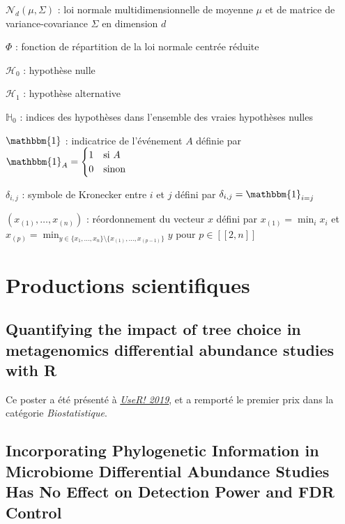 \documentclass[12pt,a4paper]{reedthesis}
\newcommand \indic {\mathbbm{1}}
\theoremstyle{definition}
\theoremstyle{definition}
\theoremstyle{definition}
\theoremstyle{remark}
\begin{document}
\(\mathcal{N}_{d}\left(\mu,\Sigma\right)\) : loi normale multidimensionnelle de moyenne \(\mu\) et de matrice de variance-covariance \(\Sigma\) en dimension \(d\)

\(\Phi\) : fonction de répartition de la loi normale centrée réduite

\(\mathcal{H}_0\) : hypothèse nulle

\(\mathcal{H}_1\) : hypothèse alternative

\(\mathbb{H}_0\) : indices des hypothèses dans l'ensemble des vraies hypothèses nulles

\(\indic\) : indicatrice de l'événement \(A\) définie par \(\indic_{A} = \begin{cases}1 & \text{si }A\\ 0 & \text{sinon}\end{cases}\)

\(\delta_{i,j}\) : symbole de Kronecker entre \(i\) et \(j\) défini par \(\delta_{i,j} = \indic_{i=j}\)

\((x_{(1)}, \ldots, x_{(n)})\) : réordonnement du vecteur \(x\) défini par \(x_{(1)} = \min_i x_i\) et \(x_{(p)} = \min_{y \in \{x_1, \ldots, x_n\} \setminus \{x_{(1)}, \ldots, x_{(p - 1)}\}} y\) pour \(p \in [\![2,n]\!]\)

\hypertarget{productions-scientifiques}{%
\chapter{Productions scientifiques}\label{productions-scientifiques}}

\hypertarget{quantifying-the-impact-of-tree-choice-in-metagenomics-differential-abundance-studies-with-r}{%
\section*{Quantifying the impact of tree choice in metagenomics differential abundance studies with R}\label{quantifying-the-impact-of-tree-choice-in-metagenomics-differential-abundance-studies-with-r}}

Ce poster a été présenté à \href{https://www.user2019.fr/posters/}{\emph{UseR! 2019}}, et a remporté le premier prix dans la catégorie \emph{Biostatistique}.



\hypertarget{incorporating-phylogenetic-information-in-microbiome-differential-abundance-studies-has-no-effect-on-detection-power-and-fdr-control}{%
\section*{Incorporating Phylogenetic Information in Microbiome Differential Abundance Studies Has No Effect on Detection Power and FDR Control}\label{incorporating-phylogenetic-information-in-microbiome-differential-abundance-studies-has-no-effect-on-detection-power-and-fdr-control}}
\end{document}
